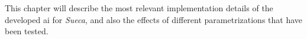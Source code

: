 \label{chapter:artificial-player}

This chapter will describe the most relevant implementation details of the developed \ac{ai} for \emph{Sueca}, and also the effects of different parametrizations that have been tested.



















